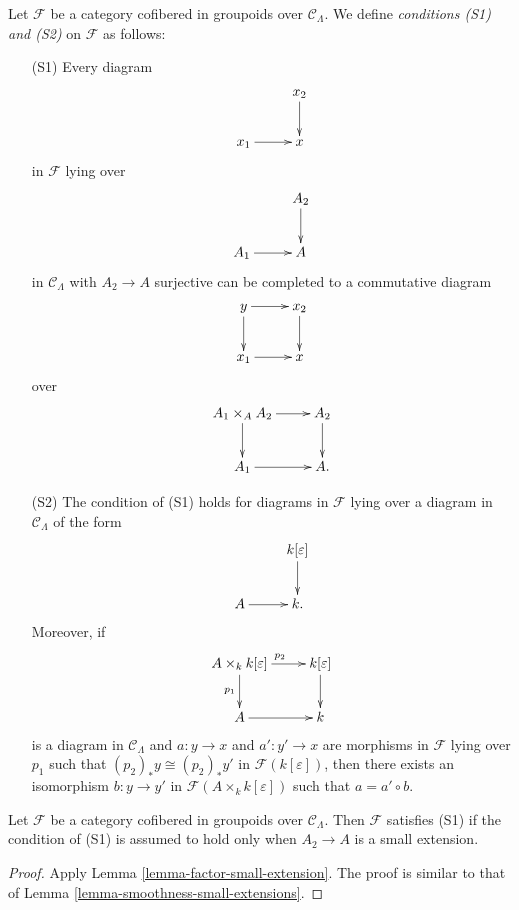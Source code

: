 \begin{definition}
\label{definition-S1-S2}
Let $\mathcal{F}$ be a category cofibered in groupoids over $\mathcal 
C_\Lambda$. We define {\it conditions (S1) and (S2)}
on $\mathcal{F}$ as follows:
\begin{enumerate}
\item[(S1)] Every diagram
\[
\xymatrix{
           & x_2 \ar[d] \\
x_1 \ar[r] & x   
}
\]
in $\mathcal{F}$ lying over
\[
\xymatrix{
           & A_2 \ar[d] \\
A_1 \ar[r] & A   
}
\]  
in $\mathcal{C}_\Lambda$ with $A_2 \to A$ surjective can be completed 
to a commutative diagram
\[
\xymatrix{
y \ar[r] \ar[d] & x_2 \ar[d] \\
x_1 \ar[r]      & x   
}
\]
over
\[
\xymatrix{
A_1 \times_{A} A_2 \ar[r] \ar[d] & A_2 \ar[d] \\ 
A_1 \ar[r]      & A.   
}
\]

\item[(S2)] The condition of (S1) holds for diagrams in $\mathcal{F}$ lying over 
a diagram in $\mathcal{C}_\Lambda$ of the form
\[
\xymatrix{
          & k[\varepsilon] \ar[d] \\
A  \ar[r] & k . 
}
\]  
Moreover, if
\[
\xymatrix{
A \times_{k} k[\varepsilon]  \ar[r]^{p_2} \ar[d]_{p_1}  & k[\varepsilon] \ar[d] 
\\
A  \ar[r] & k 
}
\]  
is a diagram in $\mathcal{C}_\Lambda$ and $a: y \to x$ and $a': y' 
\to x$ are morphisms in $\mathcal{F}$ lying over $p_{1}$ such that 
$(p_2)_{*}y \cong (p_2)_{*}y'$ in $\mathcal{F}(k[\varepsilon])$, then there 
exists an isomorphism $b: y \to y'$ in $\mathcal{F}(A \times_{k} 
k[\varepsilon])$ such that $a = a' \circ b$.
\end{enumerate}
\end{definition}

\begin{lemma}
\label{lemma-S1-small-extensions}
Let $\mathcal{F}$ be a category cofibered in groupoids over $\mathcal 
C_\Lambda$. Then $\mathcal{F}$ satisfies (S1) if the condition of (S1)
is assumed to hold only when $A_2 \to A$ is a small extension.
\end{lemma}

\begin{proof}
Apply Lemma \ref{lemma-factor-small-extension}.  The proof is similar to that 
of Lemma \ref{lemma-smoothness-small-extensions}.
\end{proof}

